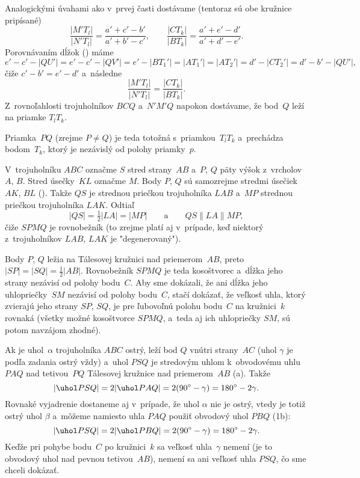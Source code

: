 {Analogickými úvahami ako v~prvej časti dostávame (tentoraz sú obe kružnice pripísané)
$$
\frac{|M'T_l|}{|N'T_l|}=\frac{a'+c'-b'}{a'+b'-c'},\qquad
\frac{|CT_k|}{|BT_k|}=\frac{a'+e'-d'}{a'+d'-e'}.
$$
Porovnávaním dĺžok (\obr) máme
$$
e'-c'-|QU'|=e'-c'-|QV'|=e'-|BT_1'|=|AT_1'|=|AT_2'|=d'-|CT_2'|=d'-b'-|QU'|,
$$
čiže $c'-b'=e'-d'$ a~následne
$$
\frac{|M'T_l|}{|N'T_l|}=\frac{|CT_k|}{|BT_k|}.
$$
Z~rovnoľahlosti trojuholníkov $BCQ$ a~$N'M'Q$ napokon dostávame, že bod~$Q$ leží na priamke $T_lT_k$.

\smallskip
Priamka~$PQ$ (zrejme $P\ne Q$) je teda totožná s~priamkou~$T_lT_k$ a~prechádza bodom~$T_k$, ktorý je nezávislý od polohy priamky~$p$.
}

{%
V~trojuholníku $ABC$ označme $S$ stred strany~$AB$ a~$P$, $Q$ päty výšok z~vrcholov $A$, $B$. Stred úsečky~$KL$ označme $M$. Body $P$, $Q$ sú samozrejme stredmi úsečiek $AK$, $BL$ (\obr). Takže $QS$ je strednou priečkou trojuholníka $LAB$ a~$MP$ strednou priečkou trojuholníka $LAK$. Odtiaľ
$$
|QS|=\tfrac12|LA|=|MP|\qquad\text{a}\qquad QS\parallel LA\parallel MP,
$$
čiže $SPMQ$ je rovnobežník (to zrejme platí aj v~prípade, keď niektorý z~trojuholníkov $LAB$, $LAK$ je "degenerovaný"). %

Body $P$, $Q$ ležia na Tálesovej kružnici nad priemerom~$AB$, preto $|SP|=|SQ|=\frac12|AB|$. Rovnobežník $SPMQ$ je teda kosoštvorec a~dĺžka jeho strany nezávisí od polohy bodu~$C$. Aby sme dokázali, že ani dĺžka jeho uhlopriečky~$SM$ nezávisí od polohy bodu~$C$, stačí dokázať, že veľkosť uhla, ktorý zvierajú jeho strany $SP$, $SQ$, je pre ľubovoľnú polohu bodu~$C$ na kružnici~$k$ rovnaká (všetky možné kosoštvorce $SPMQ$, a~teda aj ich uhlopriečky $SM$, sú potom navzájom zhodné).
%

Ak je uhol~$\alpha$ trojuholníka $ABC$ ostrý, leží bod $Q$ vnútri strany~$AC$ (uhol $\gamma$ je podľa zadania ostrý vždy) a~uhol $PSQ$ je stredovým uhlom k~obvodovému uhlu $PAQ$ nad tetivou~$PQ$ Tálesovej kružnice nad priemerom~$AB$ (\obr{}a). Takže
$$
|\uhol PSQ|=2|\uhol PAQ|=2(90^\circ-\gamma)=180^\circ-2\gamma.
$$
Rovnaké vyjadrenie dostaneme aj v~prípade, že uhol $\alpha$ nie je ostrý, vtedy je totiž ostrý uhol $\beta$ a~môžeme namiesto uhla $PAQ$ použiť obvodový uhol $PBQ$ (\obrr1b):
$$
|\uhol PSQ|=2|\uhol PBQ|=2(90^\circ-\gamma)=180^\circ-2\gamma.
$$
Keďže pri pohybe bodu~$C$ po kružnici~$k$ sa veľkosť uhla~$\gamma$ nemení (je to obvodový uhol nad pevnou tetivou~$AB$), nemení sa ani veľkosť uhla $PSQ$, čo sme chceli dokázať.

}
